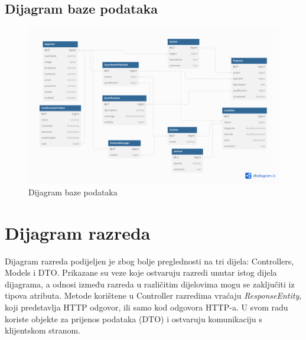 			\subsection{Dijagram baze podataka}
				\begin{figure}[H]
					\includegraphics[scale=0.35]{dijagrami/dijagram_baze_podataka.png}
					\centering
					\caption{Dijagram baze podataka}
					\label{fig:promjene}
				\end{figure}
			\eject
			
			
		\section{Dijagram razreda}
		Dijagram razreda podijeljen je zbog bolje preglednosti na tri dijela: Controllers, Models i DTO. Prikazane su veze koje ostvaruju razredi unutar istog dijela dijagrama, a odnosi između razreda u različitim dijelovima mogu se zaključiti iz tipova atributa. Metode korištene u Controller razredima vraćaju \textit{ResponseEntity}, koji predstavlja HTTP odgovor, ili samo kod odgovora HTTP-a. U svom radu koriste objekte za prijenos podataka (DTO) i ostvaruju komunikaciju s klijentskom stranom.
			
